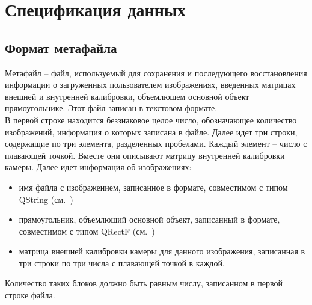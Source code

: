 \section{Спецификация данных}
\subsection{Формат метафайла}
Метафайл -- файл, используемый для сохранения и последующего восстановления информации о загруженных пользователем изображениях, введенных матрицах внешней и внутренней калибровки, объемлющем основной объект прямоугольнике. Этот файл записан в текстовом формате.\\
В первой строке находится беззнаковое целое число, обозначающее количество изображений, информация о которых записана в файле.
Далее идет три строки, содержащие по три элемента, разделенных пробелами. Каждый элемент -- число с плавающей точкой. Вместе они описывают матрицу внутренней калибровки камеры.
Далее идет информация об изображениях:
\begin{itemize}
\item имя файла с изображением, записанное в формате, совместимом с типом QString (см.~\cite{qt_qstring})
\item прямоугольник, объемлющий основной объект, записанный в формате, совместимом с типом QRectF (см.~\cite{qt_qrectf})
\item матрица внешней калибровки камеры для данного изображения, записанная в три строки по три числа с плавающей точкой в каждой.
\end{itemize}
Количество таких блоков должно быть равным числу, записанном в первой строке файла.

